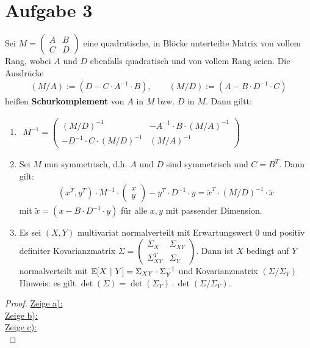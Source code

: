 \documentclass[12pt,a4paper]{article}
\begin{document}
\section*{Aufgabe 3}
Sei $M=\begin{pmatrix}
A & B\\ C & D
\end{pmatrix}$ eine quadratische, in Blöcke unterteilte Matrix von vollem Rang, wobei $A$ und $D$ ebenfalls quadratisch und von vollem Rang seien. Die Ausdrücke
\begin{align*}
(M/A):=\left(D-C\cdot A^{-1}\cdot B\right),\qquad(M/D):=\left(A-B\cdot D^{-1}\cdot C\right)
\end{align*}
heißen \textbf{Schurkomplement} von $A$ in $M$ bzw. $D$ in $M$. Dann giltt:
\begin{enumerate}[label=\alph*)]
\item $\begin{aligned}
M^{-1}=\begin{pmatrix}
(M/D)^{-1} & -A^{-1}\cdot B\cdot(M/A)^{-1}\\
-D^{-1}\cdot C\cdot(M/D)^{-1} & (M/A)^{-1}
\end{pmatrix}
\end{aligned}$
\item Sei $M$ nun symmetrisch, d.h. $A$ und $D$ sind symmetrisch und $C=B^T$. Dann gilt:
\begin{align*}
(x^T,y^T)\cdot M^{-1}\cdot\begin{pmatrix}
x\\y
\end{pmatrix}-y^T\cdot D^{-1}\cdot y=\tilde{x}^T\cdot(M/D)^{-1}\cdot\tilde{x}
\end{align*}
mit $\tilde{x}=\left(x-B\cdot D^{-1}\cdot y\right)$ für alle $x,y$ mit passender Dimension.
\item Es sei $(X,Y)$ multivariat normalverteilt mit Erwartungswert 0 und positiv definiter Kovarianzmatrix $\Sigma=\begin{pmatrix}
\Sigma_X & \Sigma_{XY}\\ \Sigma_{XY}^T & \Sigma_Y
\end{pmatrix}$. Dann ist $X$ bedingt auf $Y$ normalverteilt mit $\mathbb{E}[X~|~Y]=\Sigma_{XY}\cdot\Sigma_{Y}^{-1}$ und Kovarianzmatrix $(\Sigma/\Sigma_Y)$\\
Hinweis: es gilt $\det(\Sigma)=\det(\Sigma_Y)\cdot\det(\Sigma/\Sigma_Y)$.
\end{enumerate}
\begin{proof}
\underline{Zeige a):}\\

\underline{Zeige b):}\\

\underline{Zeige c):}\\
\end{proof}
\end{document}
